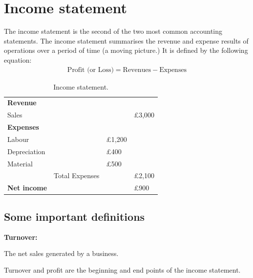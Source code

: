 \section{Income statement}
The income statement is the second of the two most common accounting statements. The income statement summarises the revenue and expense results of operations over a period of time (a moving picture.) It is defined by the following equation:
\begin{gather}
    \textrm{Profit (or Loss)} = \textrm{Revenues} - \textrm{Expenses}
\end{gather}
\begin{table}[H]
    \centering
    \begin{tabular}{@{}llll@{}}
        \toprule
        \textbf{Revenue}    &                &               &               \\
        Sales               &                &               & \pounds 3,000 \\
        \midrule
        \textbf{Expenses}   &                &               &               \\
        Labour              &                & \pounds 1,200 &               \\
        Depreciation        &                & \pounds 400   &               \\
        Material            &                & \pounds 500   &               \\
        \midrule
                            & Total Expenses &               & \pounds 2,100 \\
        \textbf{Net income} &                &               & \pounds 900   \\
        \bottomrule
    \end{tabular}
    \caption{Income statement.}
\end{table}
\subsection{Some important definitions}
\textbf{Turnover:}
\begin{quoting}
    The net sales generated by a business.
\end{quoting}
Turnover and profit are the beginning and end points of the income statement.
